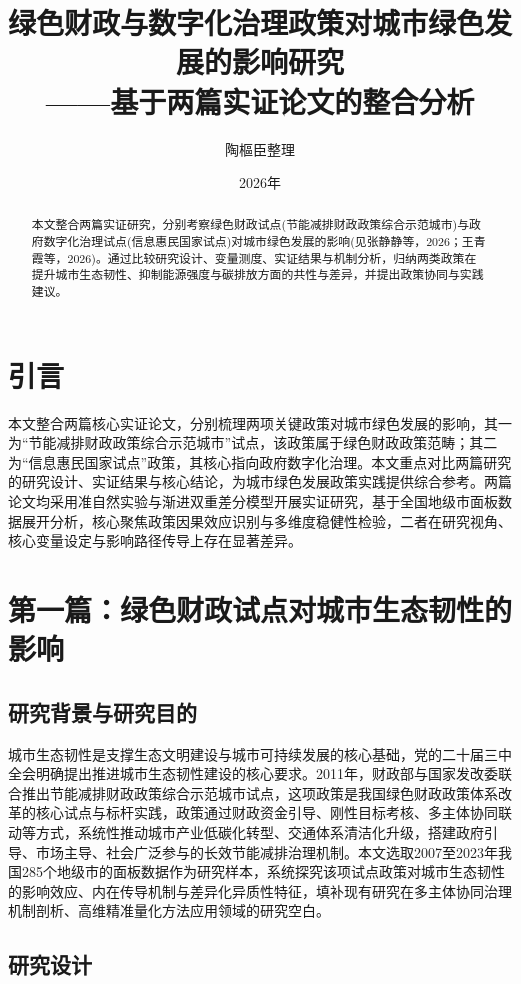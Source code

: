 \documentclass[lang=cn,a4paper,11pt]{elegantpaper}
\title{绿色财政与数字化治理政策对城市绿色发展的影响研究\\——基于两篇实证论文的整合分析}
\author{陶樞臣整理}
\institute{整理于 2026年}
\date{2026年}
\begin{document}
\maketitle

\begin{abstract}
本文整合两篇实证研究，分别考察绿色财政试点(节能减排财政政策综合示范城市)与政府数字化治理试点(信息惠民国家试点)对城市绿色发展的影响(见张静静等，2026；王青霞等，2026)。通过比较研究设计、变量测度、实证结果与机制分析，归纳两类政策在提升城市生态韧性、抑制能源强度与碳排放方面的共性与差异，并提出政策协同与实践建议。
\end{abstract}

\tableofcontents
\vspace{1em}

\section{引言}
本文整合两篇核心实证论文，分别梳理两项关键政策对城市绿色发展的影响，其一为“节能减排财政政策综合示范城市”试点，该政策属于绿色财政政策范畴；其二为“信息惠民国家试点”政策，其核心指向政府数字化治理。本文重点对比两篇研究的研究设计、实证结果与核心结论，为城市绿色发展政策实践提供综合参考。两篇论文均采用准自然实验与渐进双重差分模型开展实证研究，基于全国地级市面板数据展开分析，核心聚焦政策因果效应识别与多维度稳健性检验，二者在研究视角、核心变量设定与影响路径传导上存在显著差异。

\section{第一篇：绿色财政试点对城市生态韧性的影响}
\subsection{研究背景与研究目的}
城市生态韧性是支撑生态文明建设与城市可持续发展的核心基础，党的二十届三中全会明确提出推进城市生态韧性建设的核心要求。2011年，财政部与国家发改委联合推出节能减排财政政策综合示范城市试点，这项政策是我国绿色财政政策体系改革的核心试点与标杆实践，政策通过财政资金引导、刚性目标考核、多主体协同联动等方式，系统性推动城市产业低碳化转型、交通体系清洁化升级，搭建政府引导、市场主导、社会广泛参与的长效节能减排治理机制。本文选取2007至2023年我国285个地级市的面板数据作为研究样本，系统探究该项试点政策对城市生态韧性的影响效应、内在传导机制与差异化异质性特征，填补现有研究在多主体协同治理机制剖析、高维精准量化方法应用领域的研究空白。
\subsection{研究设计}
\end{document}
